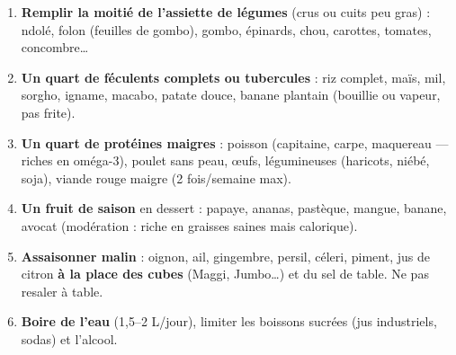 \documentclass[11pt]{article}
\begin{document}
\begin{methode}
\begin{enumerate}
\item \textbf{Remplir la moitié de l'assiette de légumes} (crus ou cuits peu gras) : ndolé, folon (feuilles de gombo), gombo, épinards, chou, carottes, tomates, concombre\ldots
\item \textbf{Un quart de féculents complets ou tubercules} : riz complet, maïs, mil, sorgho, igname, macabo, patate douce, banane plantain (bouillie ou vapeur, pas frite).
\item \textbf{Un quart de protéines maigres} : poisson (capitaine, carpe, maquereau — riches en oméga-3), poulet sans peau, œufs, légumineuses (haricots, niébé, soja), viande rouge maigre (2 fois/semaine max).
\item \textbf{Un fruit de saison} en dessert : papaye, ananas, pastèque, mangue, banane, avocat (modération : riche en graisses saines mais calorique).
\item \textbf{Assaisonner malin} : oignon, ail, gingembre, persil, céleri, piment, jus de citron \textbf{à la place des cubes} (Maggi, Jumbo\ldots) et du sel de table. Ne pas resaler à table.
\item \textbf{Boire de l'eau} (1,5--2 L/jour), limiter les boissons sucrées (jus industriels, sodas) et l'alcool.
\end{enumerate}
\end{methode}
\end{document}

